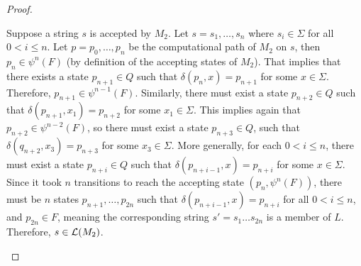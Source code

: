 \begin{problem}
\begin{Answer}
\begin{claim}
\begin{proof}
\begin{enumroman}
          \step
          Suppose a string $s$ is accepted by $M_2$.
          Let $s = s_1, \ldots, s_n$ where $s_i \in \Sigma$ for all $0 < i \le n$.
          Let $p = p_0, \ldots, p_n$ be the computational path of $M_2$ on $s$,
          then $p_n \in \psi^n(F)$ (by definition of the accepting states of $M_2$).
          That implies that there exists a state $p_{n+1} \in Q$ such that
          $\delta(p_n, x) = p_{n+1}$ for some $x \in \Sigma$.
          Therefore, $p_{n+1} \in \psi^{n-1}(F)$.
          Similarly, there must exist a state $p_{n+2} \in Q$ such that
          $\delta(p_{n+1}, x_1) = p_{n+2}$ for some $x_1 \in \Sigma$.
          This implies again that $p_{n+2} \in \psi^{n-2}(F)$,
          so there must exist a state $p_{n+3} \in Q$, such that
          $\delta(q_{n+2}, x_3) = p_{n+3}$ for some $x_3 \in \Sigma$.
          More generally, for each $0 < i \le n$, there must exist a state $p_{n+i} \in Q$ such that
          $\delta(p_{n+i-1}, x) = p_{n+i}$ for some $x \in \Sigma$.
          Since it took $n$ transitions to reach the accepting state $(p_n, \psi^n(F))$,
          there must be $n$ states $p_{n+1}, \ldots, p_{2n}$ such that
          $\delta(p_{n+i-1}, x) = p_{n+i}$ for all $0 < i \le n$,
          and $p_{2n} \in F$, meaning
          the corresponding string $s' = s_1 \ldots s_{2n}$ is a member of $L$.
          Therefore, $s \in \mathcal{L}(M_2)$.
        \end{enumroman}
      \end{proof}
    \end{claim}
  \end{Answer}
\end{problem}
